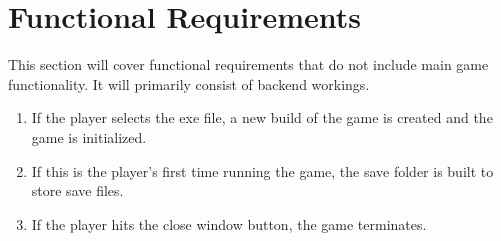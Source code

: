 \documentclass{article}
\begin{document}
\section{Functional Requirements}
\quad This section will cover functional requirements that do not include main game functionality. It will primarily consist of backend workings.
\begin{enumerate}[{FR}1. ]
	\item If the player selects the exe file, a new build of the game is created and the game is initialized.
	\item If this is the player's first time running the game, the save folder is built to store save files.
	\item If the player hits the close window button, the game terminates.
\end{enumerate}
\end{document}
